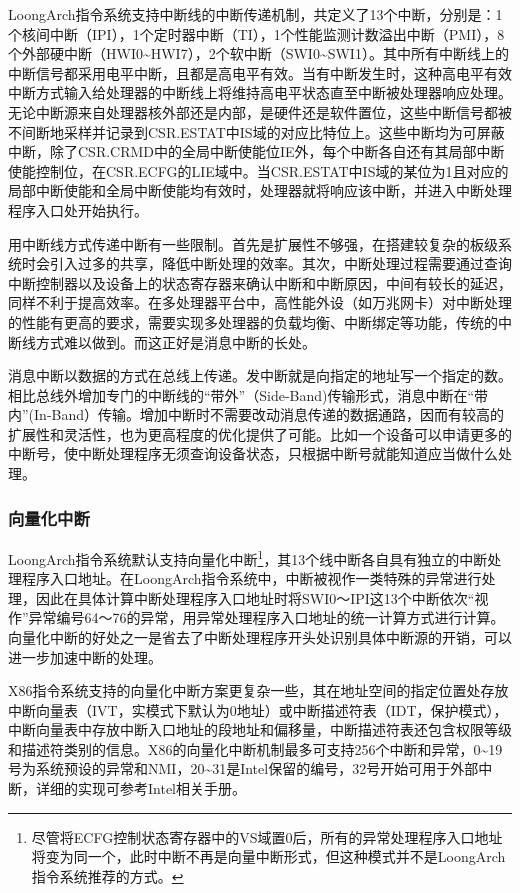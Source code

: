 \documentclass[]{ctexbook}
\begin{document}
LoongArch指令系统支持中断线的中断传递机制，共定义了13个中断，分别是：1个核间中断（IPI），1个定时器中断（TI），1个性能监测计数溢出中断（PMI），8个外部硬中断（HWI0\textasciitilde HWI7），2个软中断（SWI0\textasciitilde SWI1）。其中所有中断线上的中断信号都采用电平中断，且都是高电平有效。当有中断发生时，这种高电平有效中断方式输入给处理器的中断线上将维持高电平状态直至中断被处理器响应处理。无论中断源来自处理器核外部还是内部，是硬件还是软件置位，这些中断信号都被不间断地采样并记录到CSR.ESTAT中IS域的对应比特位上。这些中断均为可屏蔽中断，除了CSR.CRMD中的全局中断使能位IE外，每个中断各自还有其局部中断使能控制位，在CSR.ECFG的LIE域中。当CSR.ESTAT中IS域的某位为1且对应的局部中断使能和全局中断使能均有效时，处理器就将响应该中断，并进入中断处理程序入口处开始执行。

用中断线方式传递中断有一些限制。首先是扩展性不够强，在搭建较复杂的板级系统时会引入过多的共享，降低中断处理的效率。其次，中断处理过程需要通过查询中断控制器以及设备上的状态寄存器来确认中断和中断原因，中间有较长的延迟，同样不利于提高效率。在多处理器平台中，高性能外设（如万兆网卡）对中断处理的性能有更高的要求，需要实现多处理器的负载均衡、中断绑定等功能，传统的中断线方式难以做到。而这正好是消息中断的长处。

消息中断以数据的方式在总线上传递。发中断就是向指定的地址写一个指定的数。相比总线外增加专门的中断线的``带外''（Side-Band)传输形式，消息中断在``带内''(In-Band）传输。增加中断时不需要改动消息传递的数据通路，因而有较高的扩展性和灵活性，也为更高程度的优化提供了可能。比如一个设备可以申请更多的中断号，使中断处理程序无须查询设备状态，只根据中断号就能知道应当做什么处理。

\hypertarget{ux5411ux91cfux5316ux4e2dux65ad}{%
\subsubsection{向量化中断}\label{ux5411ux91cfux5316ux4e2dux65ad}}

LoongArch指令系统默认支持向量化中断\footnote{尽管将ECFG控制状态寄存器中的VS域置0后，所有的异常处理程序入口地址将变为同一个，此时中断不再是向量中断形式，但这种模式并不是LoongArch指令系统推荐的方式。}，其13个线中断各自具有独立的中断处理程序入口地址。在LoongArch指令系统中，中断被视作一类特殊的异常进行处理，因此在具体计算中断处理程序入口地址时将SWI0～IPI这13个中断依次``视作''异常编号64～76的异常，用异常处理程序入口地址的统一计算方式进行计算。向量化中断的好处之一是省去了中断处理程序开头处识别具体中断源的开销，可以进一步加速中断的处理。

X86指令系统支持的向量化中断方案更复杂一些，其在地址空间的指定位置处存放中断向量表（IVT，实模式下默认为0地址）或中断描述符表（IDT，保护模式），中断向量表中存放中断入口地址的段地址和偏移量，中断描述符表还包含权限等级和描述符类别的信息。X86的向量化中断机制最多可支持256个中断和异常，0\textasciitilde19号为系统预设的异常和NMI，20\textasciitilde31是Intel保留的编号，32号开始可用于外部中断，详细的实现可参考Intel相关手册。
\end{document}
